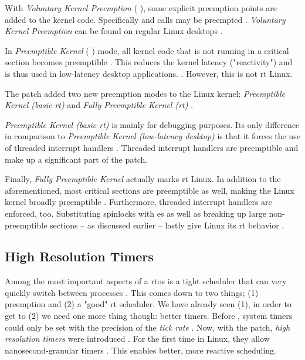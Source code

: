 \documentclass[10pt,twocolumn,a4paper]{article}
\begin{document}
With \emph{Voluntary Kernel Preemption} ( \cite{mckenney_realtime_2005}), some explicit preemption points are added to the kernel code.
Specifically  and  calls may be preempted \cite{day_re_2007}.
\emph{Voluntary Kernel Preemption} can be found on regular Linux desktops \cite{mckenney_realtime_2005}.

In \emph{Preemptible Kernel} ( \cite{mckenney_realtime_2005}) mode, all kernel code that is not running in a critical section becomes preemptible \cite{lf:preemption}.
This reduces the kernel latency ("reactivity") and is thus used in low-latency desktop applications. \cite{mckenney_realtime_2005}.
However, this is not \acrshort{rt} Linux.
\newline

\noindent The  patch added two new preemption modes to the Linux kernel:
\emph{Preemptible Kernel (basic \acrshort{rt})} and \emph{Fully Preemptible Kernel (\acrshort{rt})} \cite{lf:preemption}.

\emph{Preemptible Kernel (basic \acrshort{rt})} is mainly for debugging purposes.
Its only difference in comparison to \emph{Preemptible Kernel (low-latency desktop)} is that it forces the use of threaded interrupt handlers \cite{lf:preemption}.
Threaded interrupt handlers are preemptible and make up a significant part of the  patch.

Finally, \emph{Fully Preemptible Kernel} actually marks \acrshort{rt} Linux.
In addition to the aforementioned, most critical sections are preemptible as well, making the Linux kernel broadly preemptible \cite{lf:preemption}.
Furthermore, threaded interrupt handlers are enforced, too.
Substituting spinlocks with es as well as breaking up large non-preemptible sections -- as discussed earlier -- lastly give Linux its \acrshort{rt} behavior \cite{lf:preemption}.

\subsection{High Resolution Timers}
Among the most important aspects of a \acrshort{rtos} is a tight scheduler that can very quickly switch between processes \cite{reghenzani_realtime_2019}.
This comes down to two things; (1) preemption and (2) a "good" \acrshort{rt} scheduler.
We have already seen (1), in order to get to (2) we need one more thing though: better timers.
Before , system timers could only be set with the precision of the \emph{tick rate} \cite{reghenzani_realtime_2019}.
Now, with the patch, \emph{high resolution timers} were introduced \cite{lf:timers}.
For the first time in Linux, they allow nanosecond-granular timers \cite{reghenzani_realtime_2019}.
This enables better, more reactive scheduling.
\end{document}

